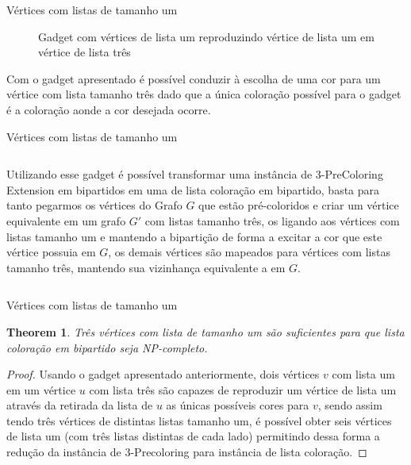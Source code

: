 \documentclass[9pt, compress]{beamer}
\newtheorem{teorema}{Theorem}
\newcommand{\?}{\textcolor{warn}{\textit{?}}}
\begin{document}
    \begin{frame}{Vértices com listas de tamanho um}
   \begin{figure}[H]
      \begin{subfigure}
        \centering
		    
      \end{subfigure}
      \begin{subfigure}
        \centering
		    
      \end{subfigure}
      \begin{subfigure}
        \centering
		    
      \end{subfigure}
      \caption{Gadget com vértices de lista um reproduzindo vértice de lista um em vértice de lista três}
      \label{fig:gadget}
  \end{figure}

      Com o gadget apresentado é possível conduzir à escolha de uma cor para um vértice com lista tamanho três dado que a única coloração possível para o gadget é a coloração aonde a cor desejada ocorre.
    \end{frame}
    \begin{frame}{Vértices com listas de tamanho um}
    \begin{columns}
      Utilizando esse gadget é possível transformar uma instância de 3-PreColoring Extension em bipartidos em uma de lista coloração em bipartido, basta para tanto pegarmos os vértices do Grafo $G$ que estão pré-coloridos e criar um vértice equivalente em um grafo $G'$ com listas tamanho três, os ligando aos vértices com listas tamanho um e mantendo a bipartição de forma a excitar a cor que este vértice possuia em $G$, os demais vértices são mapeados para vértices com listas tamanho três, mantendo sua vizinhança equivalente a em $G$.
    \end{columns}
      
    \end{frame}
     \begin{frame}{Vértices com listas de tamanho um}
       \begin{teorema}
         Três vértices com lista de tamanho um são suficientes para que lista coloração em bipartido seja NP-completo.
       \end{teorema}
       \begin{proof}
        Usando o gadget apresentado anteriormente, dois vértices $v$ com lista um em um vértice $u$ com lista três são capazes de reproduzir um vértice de lista um através da retirada da lista de $u$ as únicas possíveis cores para $v$, sendo assim tendo três vértices de distintas listas tamanho um, é possível obter seis vértices de lista um (com três listas distintas de cada lado) permitindo dessa forma a redução da instância de 3-Precoloring para instância de lista coloração.
       \end{proof}
     \end{frame}
\end{document}
